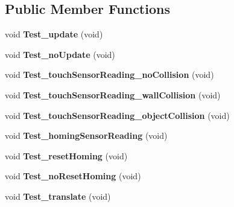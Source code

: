 \subsection*{Public Member Functions}
\begin{DoxyCompactItemize}
\item 
\hypertarget{classEnvironmentClassTests_aee6075af4f183bfbe28b58dc52cbe503}{void {\bfseries Test\-\_\-update} (void)}\label{classEnvironmentClassTests_aee6075af4f183bfbe28b58dc52cbe503}

\item 
\hypertarget{classEnvironmentClassTests_ae1d3573c39e070726e6da9a9973e9d32}{void {\bfseries Test\-\_\-no\-Update} (void)}\label{classEnvironmentClassTests_ae1d3573c39e070726e6da9a9973e9d32}

\item 
\hypertarget{classEnvironmentClassTests_a4767958e038b73a3b9845a699a81e533}{void {\bfseries Test\-\_\-touch\-Sensor\-Reading\-\_\-no\-Collision} (void)}\label{classEnvironmentClassTests_a4767958e038b73a3b9845a699a81e533}

\item 
\hypertarget{classEnvironmentClassTests_a6f21379a18dfd5843ae86d38ea89a544}{void {\bfseries Test\-\_\-touch\-Sensor\-Reading\-\_\-wall\-Collision} (void)}\label{classEnvironmentClassTests_a6f21379a18dfd5843ae86d38ea89a544}

\item 
\hypertarget{classEnvironmentClassTests_aa62641396d2185d20fdc4355904d2526}{void {\bfseries Test\-\_\-touch\-Sensor\-Reading\-\_\-object\-Collision} (void)}\label{classEnvironmentClassTests_aa62641396d2185d20fdc4355904d2526}

\item 
\hypertarget{classEnvironmentClassTests_a884759d0e3909ff33bd98936ae29e642}{void {\bfseries Test\-\_\-homing\-Sensor\-Reading} (void)}\label{classEnvironmentClassTests_a884759d0e3909ff33bd98936ae29e642}

\item 
\hypertarget{classEnvironmentClassTests_a05b646fcf2f23e9d78cfad87845daa20}{void {\bfseries Test\-\_\-reset\-Homing} (void)}\label{classEnvironmentClassTests_a05b646fcf2f23e9d78cfad87845daa20}

\item 
\hypertarget{classEnvironmentClassTests_a6a2479a2f0d094edd3f5ef2db7e234da}{void {\bfseries Test\-\_\-no\-Reset\-Homing} (void)}\label{classEnvironmentClassTests_a6a2479a2f0d094edd3f5ef2db7e234da}

\item 
\hypertarget{classEnvironmentClassTests_accffceb5e9936c93773e8430c8dde49b}{void {\bfseries Test\-\_\-translate} (void)}\label{classEnvironmentClassTests_accffceb5e9936c93773e8430c8dde49b}


\end{DoxyCompactItemize}
